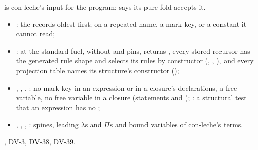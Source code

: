 \begin{definition}
  \label{def:EraseProof-DeclsOf}
  \leanok
    is con-leche's input for the program;  says its pure fold accepts it.
  \begin{itemize}
  \item {}: the records oldest first;  on a repeated name, a mark key, or a constant it cannot read;
  \item {}:  at the standard fuel, without  and  pins, returns , every stored recursor has the generated rule shape and selects its rules by constructor (, , ), and every projection table names its structure's constructor ();
  \item {}, , , : no mark key in an expression or in a closure's declarations, a free variable, no free variable in a closure (statements  and ); : a structural test that an expression has no ;
  \item {}, , , : spines, leading $\lambda$s and $\Pi$s and bound variables of con-leche's terms.
  \end{itemize}
   , DV-3, DV-38, DV-39.
\end{definition}


